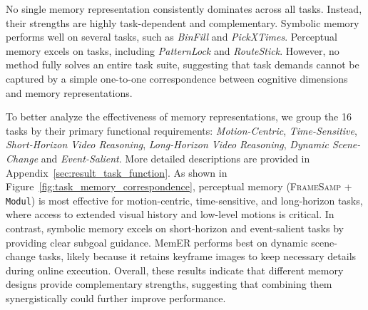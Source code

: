 No single memory representation consistently dominates across all tasks. Instead, their strengths are highly task-dependent and complementary.
Symbolic memory performs well on several \TSone\xspace tasks, such as \textit{BinFill} and \textit{PickXTimes}.
Perceptual memory excels on \TSfour\xspace tasks, including \textit{PatternLock} and \textit{RouteStick}.
However, no method fully solves an entire task suite, suggesting that task demands cannot be captured by a simple one-to-one correspondence between cognitive dimensions and memory representations.





To better analyze the effectiveness of memory representations, we group the 16 tasks by their primary functional requirements: \textit{Motion-Centric}, \textit{Time-Sensitive}, \textit{Short-Horizon Video Reasoning}, \textit{Long-Horizon Video Reasoning}, \textit{Dynamic Scene-Change} and \textit{Event-Salient}. 
More detailed descriptions are provided in Appendix~\ref{sec:result_task_function}.
As shown in Figure~\ref{fig:task_memory_correspondence}, perceptual memory (\textsc{FrameSamp} + \texttt{Modul}) is most effective for motion-centric, time-sensitive, and long-horizon tasks, where access to extended visual history and low-level motions is critical. In contrast, symbolic memory excels on short-horizon and event-salient tasks by providing clear subgoal guidance. MemER performs best on dynamic scene-change tasks, likely because it retains keyframe images to keep necessary details during online execution. Overall, these results indicate that different memory designs provide complementary strengths, suggesting that combining them synergistically could further improve performance.


